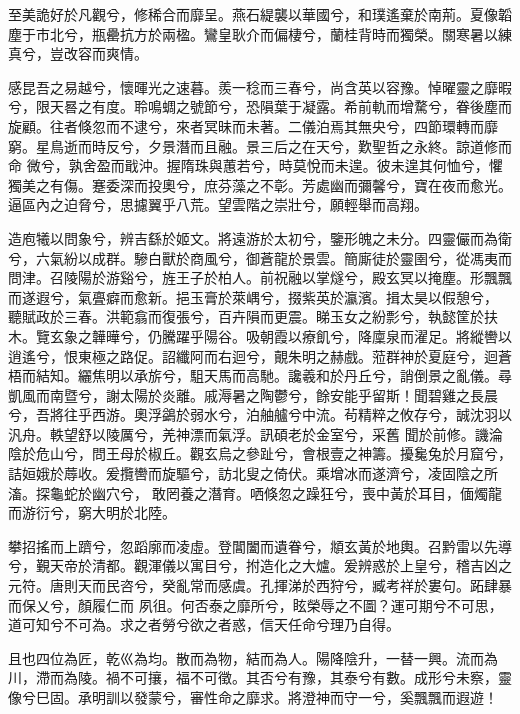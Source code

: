 \begin{pinyinscope}
 至美詭好於凡觀兮，修稀合而靡呈。燕石緹襲以華國兮，和璞遙棄於南荊。夏像韜塵于市北兮，瓶罍抗方於兩楹。鸞皇耿介而偏棲兮，蘭桂背時而獨榮。關寒暑以練真兮，豈改容而爽情。



 感昆吾之易越兮，懷暉光之速暮。羨一稔而三春兮，尚含英以容豫。悼曜靈之靡暇兮，限天晷之有度。聆鳴蜩之號節兮，恐隕葉于凝露。希前軌而增騖兮，眷後塵而旋顧。往者倏忽而不逮兮，來者冥昧而未著。二儀泊焉其無央兮，四節環轉而靡窮。星鳥逝而時反兮，夕景潛而且融。景三后之在天兮，歎聖哲之永終。諒道修而命
 微兮，孰舍盈而戢沖。握隋珠與蕙若兮，時莫悅而未遑。彼未遑其何恤兮，懼獨美之有傷。蹇委深而投奧兮，庶芬藻之不彰。芳處幽而彌馨兮，寶在夜而愈光。逼區內之迫脅兮，思攄翼乎八荒。望雲階之崇壯兮，願輕舉而高翔。



 造庖犧以問象兮，辨吉繇於姬文。將遠游於太初兮，鑒形魄之未分。四靈儼而為衛兮，六氣紛以成群。驂白獸於商風兮，御蒼龍於景雲。簡廝徒於靈圉兮，從馮夷而問津。召陵陽於游谿兮，旌王子於柏人。前祝融以掌燧兮，殿玄冥以掩塵。形飄飄而遂遐兮，氣亹癖而愈新。挹玉膏於萊嵎兮，掇紫英於瀛濱。揖太昊以假憩兮，
 聽賦政於三春。洪範翕而復張兮，百卉隕而更震。睇玉女之紛彯兮，執懿筐於扶木。覽玄象之韡曄兮，仍騰躍乎陽谷。吸朝霞以療飢兮，降廩泉而濯足。將縱轡以逍遙兮，恨東極之路促。詔纖阿而右迴兮，覿朱明之赫戲。蒞群神於夏庭兮，迴蒼梧而結知。纚焦明以承旂兮，駔天馬而高馳。讒羲和於丹丘兮，誚倒景之亂儀。尋凱風而南暨兮，謝太陽於炎離。戚溽暑之陶鬱兮，餘安能乎留斯！聞碧雞之長晨兮，吾將往乎西游。奧浮鷁於弱水兮，泊舳艫兮中流。茍精粹之攸存兮，誠沈羽以汎舟。軼望舒以陵厲兮，羌神漂而氣浮。訊碩老於金室兮，采舊
 聞於前修。譏淪陰於危山兮，問王母於椒丘。觀玄烏之參趾兮，會根壹之神籌。擾毚兔於月窟兮，詰姮娥於蓐收。爰攬轡而旋驅兮，訪北叟之倚伏。乘增冰而遂濟兮，凌固陰之所滀。探龜蛇於幽穴兮，敢罔養之潛育。哂倏忽之躁狂兮，喪中黃於耳目，偭燭龍而游衍兮，窮大明於北陸。



 攀招搖而上躋兮，忽蹈廓而凌虛。登閶闔而遺眷兮，頫玄黃於地輿。召黔雷以先導兮，覲天帝於清都。觀渾儀以寓目兮，拊造化之大爐。爰辨惑於上皇兮，稽吉凶之元符。唐則天而民咨兮，癸亂常而感虞。孔揮涕於西狩兮，臧考祥於婁句。跖肆暴而保乂兮，顏履仁而
 夙徂。何否泰之靡所兮，眩榮辱之不圖？運可期兮不可思，道可知兮不可為。求之者勞兮欲之者惑，信天任命兮理乃自得。



 且也四位為匠，乾巛為均。散而為物，結而為人。陽降陰升，一替一興。流而為川，滯而為陵。禍不可攘，福不可徵。其否兮有豫，其泰兮有數。成形兮未察，靈像兮巳固。承明訓以發蒙兮，審性命之靡求。將澄神而守一兮，奚飄飄而遐遊！




\end{pinyinscope}
